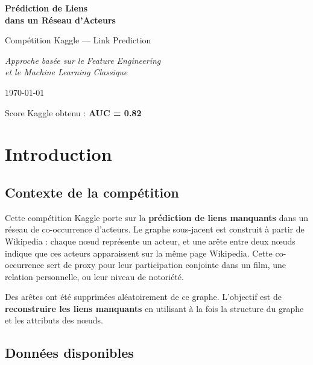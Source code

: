 \documentclass[12pt,a4paper]{article}
\begin{document}
\begin{titlepage}
\centering
\vspace*{3cm}
{\Huge\bfseries\color{blue!70!black} Prédiction de Liens\\[0.3cm] dans un Réseau d'Acteurs\par}
\vspace{1cm}
{\Large Compétition Kaggle — Link Prediction\par}
\vspace{2cm}
{\large\textit{Approche basée sur le Feature Engineering\\et le Machine Learning Classique}\par}
\vspace{3cm}
{\large\today\par}
\vfill
{\small Score Kaggle obtenu : \textbf{AUC = 0.82}\par}
\end{titlepage}

\tableofcontents
\newpage

\section{Introduction}

\subsection{Contexte de la compétition}

Cette compétition Kaggle porte sur la \textbf{prédiction de liens manquants} dans un réseau de co-occurrence d'acteurs. Le graphe sous-jacent est construit à partir de Wikipedia : chaque nœud représente un acteur, et une arête entre deux nœuds indique que ces acteurs apparaissent sur la même page Wikipedia. Cette co-occurrence sert de proxy pour leur participation conjointe dans un film, une relation personnelle, ou leur niveau de notoriété.

Des arêtes ont été supprimées aléatoirement de ce graphe. L'objectif est de \textbf{reconstruire les liens manquants} en utilisant à la fois la structure du graphe et les attributs des nœuds.

\subsection{Données disponibles}
\end{document}
